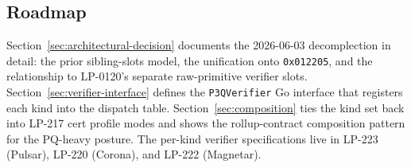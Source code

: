 \subsection{Roadmap}

Section~\ref{sec:architectural-decision} documents the 2026-06-03
decomplection in detail: the prior sibling-slots model, the
unification onto \texttt{0x012205}, and the relationship to
LP-0120's separate raw-primitive verifier slots.
Section~\ref{sec:verifier-interface} defines the
\texttt{P3QVerifier} Go interface that registers each kind into
the dispatch table. Section~\ref{sec:composition} ties the kind
set back into LP-217 cert profile modes and shows the
rollup-contract composition pattern for the PQ-heavy posture. The
per-kind verifier specifications live in LP-223 (Pulsar), LP-220
(Corona), and LP-222 (Magnetar).
